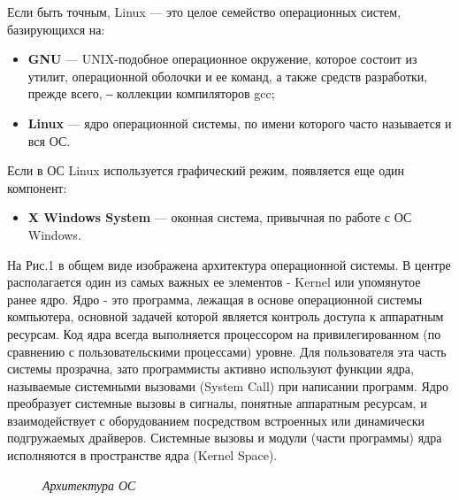 \documentclass[14pt, a4paper]{article}
\begin{document}
Если быть точным, Linux — это целое семейство операционных систем, базирующихся на:
\begin{itemize}
    \item \textbf{GNU} — UNIX-подобное операционное окружение, которое состоит из утилит, операционной
    оболочки и ее команд, а также средств разработки, прежде всего, ‒ коллекции компиляторов
    gcc;
    \item \textbf{Linux} — ядро операционной системы, по имени которого часто называется и вся ОС.
\end{itemize}
Если в ОС Linux используется графический режим, появляется еще один компонент:
\begin{itemize}
    \item \textbf{X Windows System} — оконная система, привычная по работе с ОС Windows.
\end{itemize}
На Рис.1 в общем виде изображена архитектура операционной системы. В центре
располагается один из самых важных ее элементов - Kernel или упомянутое ранее ядро. Ядро - это
программа, лежащая в основе операционной системы компьютера, основной задачей которой
является контроль доступа к аппаратным ресурсам. Код ядра всегда выполняется процессором на
привилегированном (по сравнению с пользовательскими процессами) уровне. Для пользователя эта
часть системы прозрачна, зато программисты активно используют функции ядра, называемые
системными вызовами (System Call) при написании программ. Ядро преобразует системные вызовы в
сигналы, понятные аппаратным ресурсам, и взаимодействует с оборудованием посредством
встроенных или динамически подгружаемых драйверов. Системные вызовы и модули (части
программы) ядра исполняются в пространстве ядра (Kernel Space).

\begin{figure}[h]%
    \centering
    \caption{\textit{Архитектура ОС}\\}
    \label{1.0} %
\end{figure}
\end{document}
